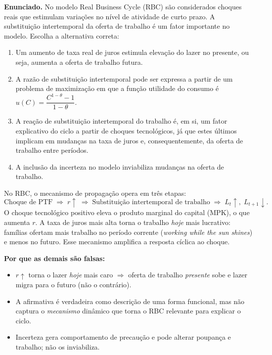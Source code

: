 \documentclass[12pt, a4paper]{article}
\begin{document}
\textbf{Enunciado.} No modelo Real Business Cycle (RBC) são considerados choques reais que estimulam variações no nível de atividade de curto prazo. A substituição intertemporal da oferta de trabalho é um fator importante no modelo. Escolha a alternativa correta:

\begin{enumerate}[label=\alph*)]
\item Um aumento de taxa real de juros estimula elevação do lazer no presente, ou seja, aumenta a oferta de trabalho futura.
\item A razão de substituição intertemporal pode ser expressa a partir de um problema de maximização em que a função utilidade do consumo é $u(C) = \dfrac{C^{1-\theta}-1}{1-\theta}$.
\item A reação de substituição intertemporal do trabalho é, em si, um fator explicativo do ciclo a partir de choques tecnológicos, já que estes últimos implicam em mudanças na taxa de juros e, consequentemente, da oferta de trabalho entre períodos.
\item A inclusão da incerteza no modelo inviabiliza mudanças na oferta de trabalho.
\end{enumerate}

\begin{correctbox}[title={Resposta correta: c)}]
No RBC, o mecanismo de propagação opera em três etapas:
\[
\text{Choque de PTF} \;\Rightarrow\; r\uparrow
  \;\Rightarrow\; \text{Substituição intertemporal de trabalho}
  \;\Rightarrow\; L_t\uparrow,\; L_{t+1}\downarrow.
\]
O choque tecnológico positivo eleva o produto marginal do capital (MPK), o que aumenta $r$.
A taxa de juros mais alta torna o trabalho \emph{hoje} mais lucrativo:
famílias ofertam mais trabalho no período corrente
(\textit{working while the sun shines}) e menos no futuro.
Esse mecanismo amplifica a resposta cíclica ao choque. \checkmark

\textbf{Por que as demais são falsas:}
\begin{itemize}[leftmargin=*]
\item[a)] $r\uparrow$ torna o lazer \emph{hoje} mais caro $\Rightarrow$ oferta de trabalho \emph{presente}
sobe e lazer migra para o futuro (não o contrário).
\item[b)] A afirmativa é verdadeira como descrição de uma forma funcional, mas não captura
o \emph{mecanismo} dinâmico que torna o RBC relevante para explicar o ciclo.
\item[d)] Incerteza gera comportamento de precaução e pode alterar poupança e trabalho;
não os inviabiliza.
\end{itemize}
\end{correctbox}
\end{document}
